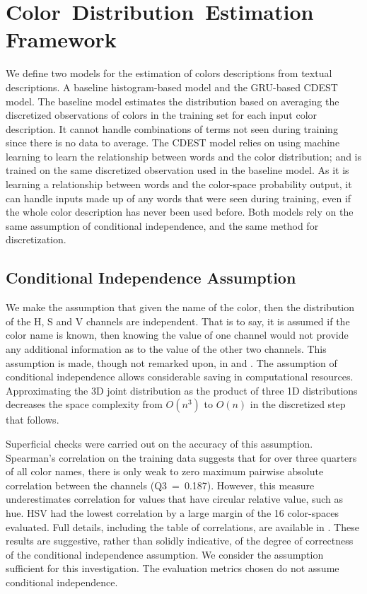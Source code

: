 \documentclass[11pt,a4paper]{article}
\newcommand{\textcite}{\cite}
\begin{document}
\section{Color~Distribution~Estimation Framework}\label{sec:method}
We define two models for the estimation of colors descriptions from textual descriptions.
A baseline histogram-based model and the GRU-based CDEST model.
The baseline model estimates the distribution based on averaging the discretized observations of colors in the training set for each input color description.
It cannot handle combinations of terms not seen during training since there is no data to average.
The CDEST model relies on using machine learning to learn the relationship between words and the color distribution; and is trained on the same discretized observation used in the baseline model.
As it is learning a relationship between words and the color-space probability output, it can handle inputs made up of any words that were seen during training, even if the whole color description has never been used before.
Both models rely on the same assumption of conditional independence, and the same method for discretization.


\subsection{Conditional Independence Assumption}\label{sec:conditional-independence-assumption}
We make the assumption that given the name of the color, then the distribution of the H, S and V channels are independent.
That is to say, it is assumed if the color name is known, then  knowing the value of one channel would not provide any additional information as to the value of the other two channels.
This assumption is made, though not remarked upon, in \textcite{meomcmahanstone:color} and \textcite{mcmahan2015bayesian}.
The assumption of conditional independence allows considerable saving in computational resources.
Approximating the 3D joint distribution as the product of three 1D distributions decreases the space complexity from $O(n^3)$ to $O(n)$ in the discretized step that follows.

Superficial checks were carried out on the accuracy of this assumption.
Spearman's correlation on the training data suggests that for over three quarters of all color names, there is only weak to zero maximum pairwise absolute correlation between the channels (\mbox{Q3 = 0.187}).
However, this measure underestimates correlation for values that have circular relative value, such as hue.
HSV had the lowest correlation by a large margin of the 16 color-spaces evaluated.
Full details, including the table of correlations, are available in .
These results are suggestive, rather than solidly indicative, of the degree of correctness of the conditional independence assumption.
We consider the assumption sufficient for this investigation.
The evaluation metrics chosen do not assume conditional independence.
\end{document}
